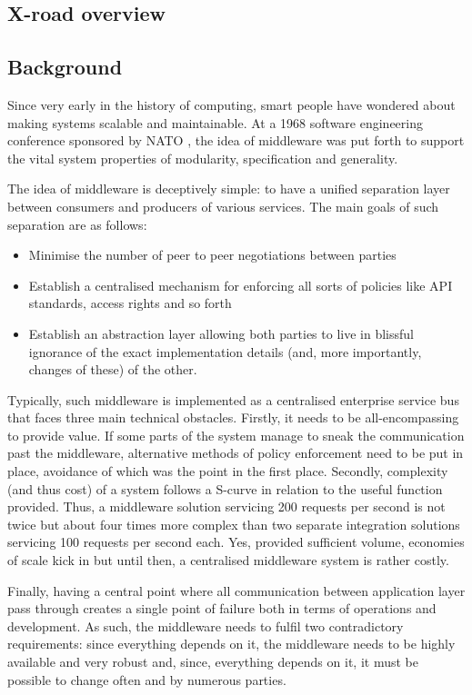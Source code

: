 \documentclass[10pt,a4paper]{article}
\begin{document}
\clearpage
\begin{appendices}
\section{X-road overview}
\subsection{Background}
Since very early in the history of computing, smart people have wondered about making systems scalable and maintainable. At a 1968 software engineering conference sponsored by NATO \citep{naur1969software}, the idea of middleware was put forth to support the vital system properties of modularity, specification and generality.

The idea of middleware is deceptively simple: to have a unified separation layer between consumers and producers of various services. The main goals of such separation are as follows:
\begin{itemize}
	\item Minimise the number of peer to peer negotiations between parties 
	\item Establish a centralised mechanism for enforcing all sorts of policies like API standards, access rights and so forth
	\item Establish an abstraction layer allowing both parties to live in blissful ignorance of the exact implementation details (and, more importantly, changes of these) of the other. 
\end{itemize}

Typically, such middleware is implemented as a centralised enterprise service bus that faces three main technical obstacles. Firstly, it needs to be all-encompassing to provide value. If some parts of the system manage to sneak the communication past the middleware, alternative methods of policy enforcement need to be put in place, avoidance of which was the point in the first place. Secondly, complexity (and thus cost) of a system follows a S-curve  in relation to the useful function provided. Thus, a middleware solution servicing 200 requests per second is not twice but about four times more complex than two separate integration solutions servicing 100 requests per second each. Yes, provided sufficient volume, economies of scale kick in but until then, a centralised middleware system is rather costly.

Finally, having a central point where all communication between application layer pass through creates a single point of failure both in terms of operations and development. As such, the middleware needs to fulfil two contradictory requirements: since everything depends on it, the middleware needs to be highly available and very robust and, since, everything depends on it, it must be possible to change often and by numerous parties. 


\end{appendices}
\end{document}
